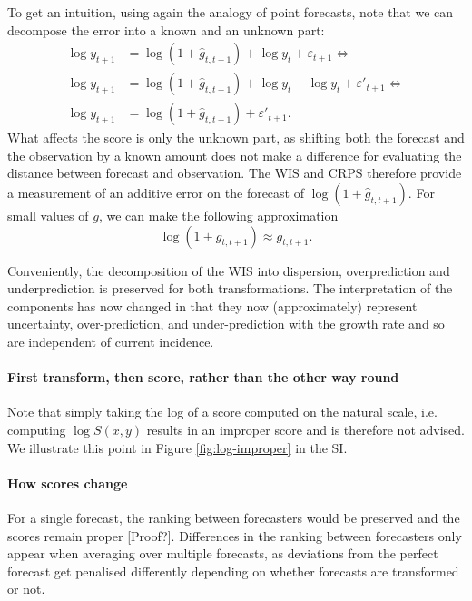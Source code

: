 \documentclass{article}
\begin{document}
To get an intuition, using again the analogy of point forecasts, note that we can decompose the error into a known and an unknown part: 
%
\begin{align}
\log y_{t+1} &= \log (1 + \hat{g}_{t, t+1}) + \log y_t + \varepsilon_{t+1} \Leftrightarrow \\
\log y_{t+1} &= \log (1 + \hat{g}_{t, t+1}) + \log y_t - \log y_t + \varepsilon'_{t+1} \Leftrightarrow \\    
\log y_{t+1} &= \log (1 + \hat{g}_{t, t+1}) + \varepsilon'_{t+1}.
\end{align}
%
%
What affects the score is only the unknown part, as shifting both the forecast and the observation by a known amount does not make a difference for evaluating the distance between forecast and observation. The WIS and CRPS therefore provide a measurement of an additive error on the forecast of $ \log (1 + \hat{g}_{t, t+1})$. For small values of $g$, we can make the following approximation
\begin{equation}
    \log (1+ g_{t, t+1}) \approx g_{t, t+1}.
\end{equation}
%

Conveniently, the decomposition of the WIS into dispersion, overprediction and underprediction is preserved for both transformations. The interpretation of the components has now changed in that they now (approximately) represent uncertainty, over-prediction, and under-prediction with the growth rate and so are independent of current incidence. 

\paragraph{First transform, then score, rather than the other way round}
Note that simply taking the log of a score computed on the natural scale, i.e. computing $\log S(x, y)$ results in an improper score and is therefore not advised. We illustrate this point in Figure \ref{fig:log-improper} in the SI. 


\paragraph{How scores change}
For a single forecast, the ranking between forecasters would be preserved and the scores remain proper [Proof?]. Differences in the ranking between forecasters only appear when averaging over multiple forecasts, as deviations from the perfect forecast get penalised differently depending on whether forecasts are transformed or not. 
\end{document}

